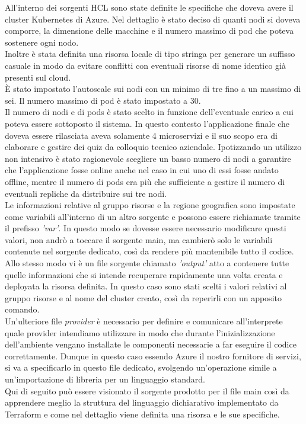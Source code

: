 \documentclass[a4paper,12pt]{report}
\begin{document}
All'interno dei sorgenti HCL sono state definite le specifiche che doveva avere il cluster Kubernetes di Azure. Nel dettaglio è stato deciso di quanti nodi si doveva comporre, la dimensione delle macchine e il numero massimo di pod che poteva sostenere ogni nodo. \\Inoltre è stata definita una risorsa locale di tipo stringa per generare un suffisso casuale in modo da evitare conflitti con eventuali risorse di nome identico già presenti sul cloud.\\
È stato impostato l'autoscale sui nodi con un minimo di tre fino a un massimo di sei. Il numero massimo di pod è stato impostato a 30.\\
Il numero di nodi e di pods è stato scelto in funzione dell'eventuale carico a cui poteva essere sottoposto il sistema. In questo contesto l'applicazione finale che doveva essere rilasciata aveva solamente 4 microservizi e il suo scopo era di elaborare e gestire dei quiz da colloquio tecnico aziendale. Ipotizzando un utilizzo non intensivo è stato ragionevole scegliere un basso numero di nodi a garantire che l'applicazione fosse online anche nel caso in cui uno di essi fosse andato offline, mentre il numero di pods era più che sufficiente a gestire il numero di eventuali repliche da distribuire sui tre nodi.\\
Le informazioni relative al gruppo risorse e la regione geografica sono impostate come variabili all'interno di un altro sorgente e possono essere richiamate tramite il prefisso \textit{'var'}. In questo modo se dovesse essere necessario modificare questi valori, non andrò a toccare il sorgente main, ma cambierò solo le variabili contenute nel sorgente dedicato, così da rendere più mantenibile tutto il codice.\\
Allo stesso modo vi è un file sorgente chiamato \textit{'output'} atto a contenere tutte quelle informazioni che si intende recuperare rapidamente una volta creata e deployata la risorsa definita. In questo caso sono stati scelti i valori relativi al gruppo risorse e al nome del cluster creato, così da reperirli con un apposito comando.\\
Un'ulteriore file \textit{provider} è necessario per definire e comunicare all'interprete quale provider intendiamo utilizzare in modo che durante l'inizializzazione dell'ambiente vengano installate le componenti necessarie a far eseguire il codice correttamente. Dunque in questo caso essendo Azure il nostro fornitore di servizi, si va a specificarlo in questo file dedicato, svolgendo un'operazione simile a un'importazione di libreria per un linguaggio standard.\\
Qui di seguito può essere visionato il sorgente prodotto per il file main così da apprendere meglio la struttura del linguaggio dichiarativo implementato da Terraform e come nel dettaglio viene definita una risorsa e le sue specifiche.\\ \\ \\ \\ \\ \\
\end{document}

